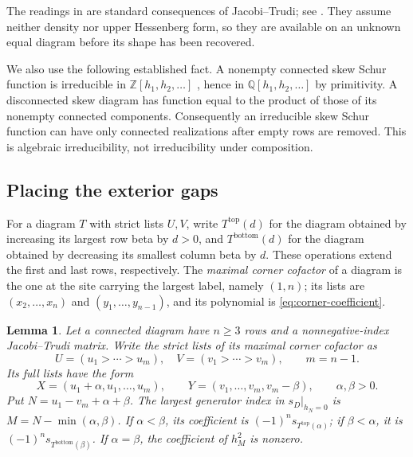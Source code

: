 \documentclass[11pt,a4paper]{amsart}
\numberwithin{equation}{section}
\theoremstyle{plain}
\newtheorem{lemma}[theorem]{Lemma}
\theoremstyle{definition}
\newcommand{\Q}{\mathbb Q}
\newcommand{\Z}{\mathbb Z}
\begin{document}
The readings in  are standard consequences of
Jacobi--Trudi; see \cite{Reiner2007Coincidences}.  They assume neither density
nor upper Hessenberg form, so they are available on an unknown equal diagram
before its shape has been recovered.

We also use the following established fact.  A nonempty connected skew Schur
function is irreducible in \(\Z[h_1,h_2,\ldots]\)
\cite[Thm.~1]{Barekat2009CoincidencesCorrigendum}, hence in
\(\Q[h_1,h_2,\ldots]\) by primitivity.  A disconnected skew diagram has
function equal to the product of those of its nonempty connected components.
Consequently an irreducible skew Schur function can have only connected
realizations after empty rows are removed.  This is algebraic irreducibility,
not irreducibility under composition.

\subsection{Placing the exterior gaps}

For a diagram \(T\) with strict lists \(U,V\), write
\(T^{\mathrm{top}}(d)\) for the diagram obtained by increasing its largest
row beta by \(d>0\), and \(T^{\mathrm{bottom}}(d)\) for the diagram obtained
by decreasing its smallest column beta by \(d\).  These operations extend
the first and last rows, respectively.  The \emph{maximal corner cofactor} of
a diagram is the one at the site carrying the largest label, namely
\((1,n)\); its lists are \((x_2,\ldots,x_n)\) and \((y_1,\ldots,y_{n-1})\),
and its polynomial is \eqref{eq:corner-coefficient}.

\begin{lemma}\label{lem:exterior-gaps}
Let a connected diagram have \(n\ge3\) rows and a nonnegative-index
Jacobi--Trudi matrix.  Write the strict lists of its maximal corner cofactor
as
\[
 U=(u_1>\cdots>u_m),\quad V=(v_1>\cdots>v_m),
 \qquad m=n-1.
\]
Its full lists have the form
\begin{equation}\label{eq:border}
 X=(u_1+\alpha,u_1,\ldots,u_m),\qquad
 Y=(v_1,\ldots,v_m,v_m-\beta),\qquad \alpha,\beta>0.
\end{equation}
Put \(N=u_1-v_m+\alpha+\beta\).
The largest generator index in \(s_D|_{h_N=0}\) is \(M=N-\min(\alpha,\beta)\).
If \(\alpha<\beta\), its coefficient is
\((-1)^n s_{T^{\mathrm{top}}(\alpha)}\); if \(\beta<\alpha\), it is
\((-1)^n s_{T^{\mathrm{bottom}}(\beta)}\).
If \(\alpha=\beta\), the coefficient of \(h_M^2\) is nonzero.
\end{lemma}
\end{document}
